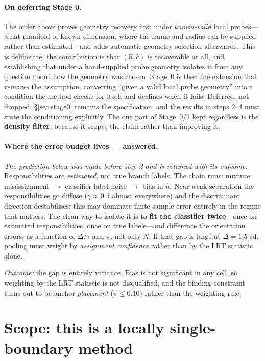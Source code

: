 \documentclass[11pt]{article}
\newcommand{\nhat}{\hat{n}}
\newcommand{\chat}{\hat{c}}
\begin{document}
\paragraph{On deferring Stage 0.} The order above proves geometry recovery first under
\emph{known-valid} local probes---a flat manifold of known dimension, where the frame and radius
can be supplied rather than estimated---and adds automatic geometry selection afterwards. This is
deliberate: the contribution is that $(\nhat,\chat)$ is recoverable at all, and establishing that
under a hand-supplied probe geometry isolates it from any question about how the geometry was
chosen. Stage~0 is then the extension that \emph{removes} the assumption, converting ``given a
valid local probe geometry'' into a condition the method checks for itself and declines when it
fails. Deferred, not dropped: \S\ref{sec:stage0} remains the specification, and the results in
steps 2--4 must state the conditioning explicitly. The one part of Stage~0/1 kept regardless is
the \textbf{density filter}, because it scopes the claim rather than improving it.

\paragraph{Where the error budget lives --- answered.} \emph{The prediction below was made
before step 2 and is retained with its outcome.} Responsibilities are
\emph{estimated}, not true branch labels. The chain runs: mixture misassignment $\to$ classifier
label noise $\to$ bias in $\nhat$. Near weak separation the responsibilities go diffuse
($\gamma \approx 0.5$ almost everywhere) and the discriminant direction destabilises; this may
dominate finite-sample error entirely in the regime that matters. The clean way to isolate it is to
\textbf{fit the classifier twice}---once on estimated responsibilities, once on true labels---and
difference the orientation errors, as a function of $\Delta/\tau$ and $\pi$, not only $N$. If that
gap is large at $\Delta = 1.5$ sd, pooling must weight by \emph{assignment confidence} rather than
by the LRT statistic alone.

\emph{Outcome:} the gap is entirely variance. Bias is not significant in any cell, so
weighting by the LRT statistic is not disqualified, and the binding constraint turns out to
be anchor \emph{placement} ($\pi \le 0.10$) rather than the weighting rule.

\section{Scope: this is a locally single-boundary method}
\label{sec:scope}
\end{document}
